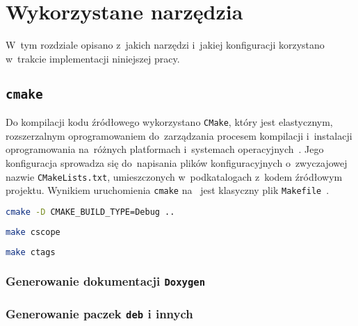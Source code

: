 \documentclass[thesis]{subfiles}
\begin{document}

\section{Wykorzystane narzędzia}

W~tym rozdziale opisano z~jakich narzędzi i~jakiej konfiguracji korzystano w~trakcie implementacji niniejszej pracy.

\subsection{\texttt{cmake}}

Do kompilacji kodu źródłowego wykorzystano \texttt{CMake}, który jest elastycznym, rozszerzalnym oprogramowaniem do~zarządzania procesem kompilacji i~instalacji oprogramowania na~różnych platformach i~systemach operacyjnych~\cite{cmake}. Jego konfiguracja sprowadza się do~napisania plików konfiguracyjnych o~zwyczajowej nazwie \mbox{\texttt{CMakeLists.txt}}, umieszczonych w~podkatalogach z~kodem źródłowym projektu. Wynikiem uruchomienia \texttt{cmake} na~ jest klasyczny plik \texttt{Makefile}~\cite{gnu-makefile-manual}.

\begin{lstlisting}[language=bash,numbers=none,caption={Uruchomienie \texttt{cmake} w~trybie \texttt{Debug}}]
cmake -D CMAKE_BUILD_TYPE=Debug ..
\end{lstlisting}

\begin{lstlisting}[language=bash,numbers=none,caption={Generowanie symboli dla \texttt{cscope}}]
make cscope
\end{lstlisting}

\begin{lstlisting}[language=bash,numbers=none,caption={Generowanie symboli dla \texttt{ctags}}]
make ctags
\end{lstlisting}

\subsubsection{Generowanie dokumentacji \texttt{Doxygen}}
\subsubsection{Generowanie paczek \texttt{deb} i innych}
\end{document}
